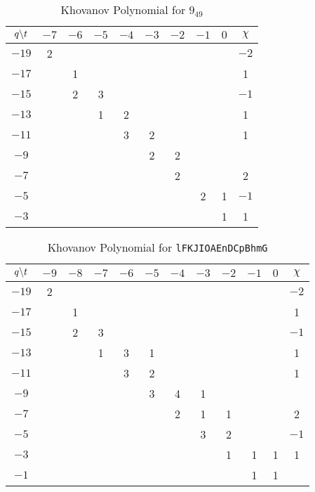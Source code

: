 \documentclass{article}
\theoremstyle{plain}
\begin{document}
        \begin{table}
            \centering
            \begin{tabular}{| c | c | c | c | c | c | c | c | c | c |}
                \hline
                $q\symbol{92}t$&$-7$&$-6$&$-5$&$-4$&$-3$&$-2$&$-1$&$0$&$\chi$\\
                \hline
                $-19$&2&&&&&&&&$-2$\\
                \hline
                $-17$&&1&&&&&&&1\\
                \hline
                $-15$&&2&3&&&&&&$-1$\\
                \hline
                $-13$&&&1&2&&&&&1\\
                \hline
                $-11$&&&&3&2&&&&1\\
                \hline
                $-9$&&&&&2&2&&&\\
                \hline
                $-7$&&&&&&2&&&2\\
                \hline
                $-5$&&&&&&&2&1&$-1$\\
                \hline
                $-3$&&&&&&&&1&1\\
                \hline
            \end{tabular}
            \caption{Khovanov Polynomial for $9_{49}$}
        \end{table}
        \begin{table}
            \centering
            \begin{tabular}{| c | c |c | c | c | c | c | c | c | c | c | c |}
                \hline
                $q\symbol{92}t$&$-9$&$-8$&$-7$&$-6$&$-5$&$-4$&$-3$&$-2$&$-1$&$0$&$\chi$\\
                \hline
                $-19$&2&&&&&&&&&&$-2$\\
                \hline
                $-17$&&1&&&&&&&&&1\\
                \hline
                $-15$&&2&3&&&&&&&&$-1$\\
                \hline
                $-13$&&&1&3&1&&&&&&1\\
                \hline
                $-11$&&&&3&2&&&&&&1\\
                \hline
                $-9$&&&&&3&4&1&&&&\\
                \hline
                $-7$&&&&&&2&1&1&&&2\\
                \hline
                $-5$&&&&&&&3&2&&&$-1$\\
                \hline
                $-3$&&&&&&&&1&1&1&1\\
                \hline
                $-1$&&&&&&&&&1&1&\\
                \hline
            \end{tabular}
            \caption{Khovanov Polynomial for \texttt{lFKJIOAEnDCpBhmG}}
        \end{table}
\end{document}
